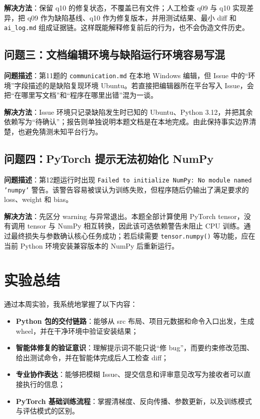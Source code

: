 \documentclass[a4paper, 12pt]{article}
\begin{document}
\textbf{解决方法}：保留 q10 的修复状态，不覆盖已有文件；人工检查 q09 与 q10 实现差异，把 q09 作为缺陷基线、q10 作为修复版本，并用测试结果、最小 diff 和 \texttt{ai\_log.md} 组成证据链。这样既能解释修复前后的行为，也不会伪造文件历史。

\subsection{问题三：文档编辑环境与缺陷运行环境容易写混}

\textbf{问题描述}：第11题的 \texttt{communication.md} 在本地 Windows 编辑，但 Issue 中的“环境”字段描述的是缺陷复现环境 Ubuntu。若直接把编辑器所在平台写入 Issue，会把“在哪里写文档”和“程序在哪里出错”混为一谈。

\textbf{解决方法}：Issue 环境只记录缺陷发生时已知的 Ubuntu、Python 3.12，并把其余依赖写为“待确认”；报告则单独说明本题文档是在本地完成。由此保持事实边界清楚，也避免猜测未知平台行为。

\subsection{问题四：PyTorch 提示无法初始化 NumPy}

\textbf{问题描述}：第12题运行时出现 \texttt{Failed to initialize NumPy: No module named 'numpy'} 警告。该警告容易被误认为训练失败，但程序随后仍输出了满足要求的 loss、weight 和 bias。

\textbf{解决方法}：先区分 warning 与异常退出。本题全部计算使用 PyTorch tensor，没有调用 tensor 与 NumPy 相互转换，因此该可选依赖警告未阻止 CPU 训练。通过最终损失与参数确认核心任务成功；若后续需要 \texttt{tensor.numpy()} 等功能，应在当前 Python 环境安装兼容版本的 NumPy 后重新运行。

\section{实验总结}

通过本周实验，我系统地掌握了以下内容：

\begin{itemize}
  \item \textbf{Python 包的交付链路}：能够从 src 布局、项目元数据和命令入口出发，生成 wheel，并在干净环境中验证安装结果；
  \item \textbf{智能体修复的验证意识}：理解提示词不能只说“修 bug”，而要约束修改范围、给出测试命令，并在智能体完成后人工检查 diff；
  \item \textbf{专业协作表达}：能够把模糊 Issue、提交信息和评审意见改写为接收者可以直接执行的信息；
  \item \textbf{PyTorch 基础训练流程}：掌握清梯度、反向传播、参数更新，以及训练模式与评估模式的区别。
\end{itemize}
\end{document}
